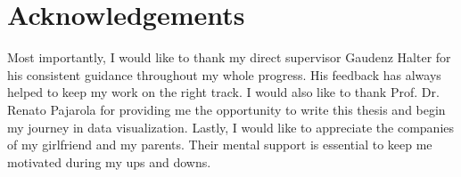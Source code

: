 \documentclass[11pt, a4paper,oneside,chapterprefix=false]{scrbook}
\begin{document}
\chapter*{Acknowledgements}
Most importantly, I would like to thank my direct supervisor Gaudenz Halter for his consistent guidance throughout my whole progress. His feedback has always helped to keep my work on the right track. I would also like to thank Prof. Dr. Renato
Pajarola for providing me the opportunity to write this thesis and begin my journey in data visualization. Lastly, I would like to appreciate the companies of my girlfriend and my parents. Their mental support is essential to keep me motivated during my ups and downs.




\listoffigures
\listoftables
\end{document}
